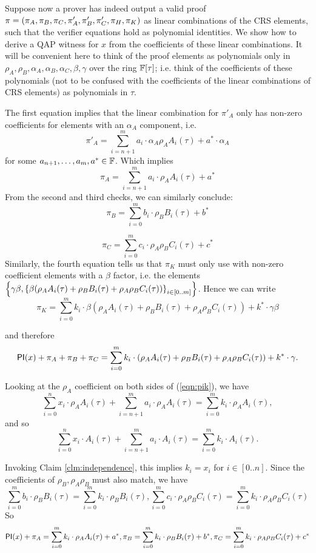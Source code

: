 \documentclass[11pt]{article}
\numberwithin{figure}{section} %
\newcommand{\set}[1]{\ensuremath{\left\{#1\right\}}\xspace}
\begin{document}
Suppose now a prover has indeed output a valid proof $\pi = (\pi_A,\pi_B,\pi_C,\pi'_A,\pi'_B,\pi'_C,\pi_H,\pi_K)$
as linear combinations of the CRS elements, such that the verifier equations hold as polynomial identities.
We show how to derive a QAP witness for $x$ from the coefficients of these linear combinations. 
It will be convenient here to think of the proof elements as polynomials only in $\rho_A,\rho_B,\alpha_A,\alpha_B,\alpha_C,\beta,\gamma$ over the ring $\mathbb F[\tau]$; i.e. think of the coefficients of these polynomials (not to be confused with the coefficients of the linear combinations of CRS elements) as polynomials in $\tau$.
 

The first equation implies that the linear combination for $\pi'_A$ only has non-zero coefficients for elements with an $\alpha_A$ component, i.e.
\[\pi'_A = \sum_{i=n+1}^m a_i\cdot  \alpha_A\rho_A A_i(\tau) + a^*\cdot \alpha_A \]
for some $a_{n+1},\ldots,a_m,a^* \in \mathbb F$.
Which implies 
\[\pi_A = \sum_{i=n+1}^m a_i \cdot \rho_A A_i(\tau) + a^*\]
From the second and third checks, we can similarly conclude:
\[\pi_B = \sum_{i=0}^m b_i\cdot  \rho_B B_i(\tau) + b^*\]

\[\pi_C = \sum_{i=0}^m c_i \cdot \rho_A\rho_B C_i(\tau) + c^*\]
Similarly, the fourth equation tells us that $\pi_K$ must only use with non-zero coefficient elements with a $\beta$ factor,
i.e. the elements $\set{\gamma\beta,\sett{\beta(\rho_A A_i(\tau) + \rho_B B_i(\tau) + \rho_A\rho_B C_i(\tau))}{i\in[0..m]}}$.
Hence we can write
\[\pi_K = \sum_{i=0}^m k_i\cdot\beta(\rho_A A_i(\tau) + \rho_B B_i(\tau) + \rho_A\rho_B C_i(\tau)) + k^*\cdot \gamma\beta\]

and therefore
\begin{equation}\label{eqn:pik}
\mathsf{PI}(x)+\pi_A +\pi_B+\pi_C= \sum_{i=0}^m k_i\cdot(\rho_A A_i(\tau) + \rho_B B_i(\tau) + \rho_A\rho_B C_i(\tau)) + k^*\cdot \gamma.
\end{equation}

Looking at the $\rho_A$ coefficient on both sides of (\ref{eqn:pik}), we have
\[\sum_{i=0}^n x_i \cdot \rho_A A_i(\tau)+\sum_{i=n+1}^m a_i \cdot \rho_A A_i(\tau) = \sum_{i=0}^m k_i\cdot \rho_A A_i(\tau),\]
and so
\[\sum_{i=0}^n x_i \cdot A_i(\tau)+\sum_{i=n+1}^m a_i \cdot A_i(\tau) = \sum_{i=0}^m k_i \cdot A_i(\tau).\]

Invoking Claim \ref{clm:independence}, this implies $k_i=x_i$ for $i\in[0..n]$.
Since the coefficients of $\rho_B,\rho_A\rho_B$ must also match, we have
\[\sum_{i=0}^m b_i\cdot  \rho_B B_i(\tau)= \sum_{i=0}^m k_i \cdot \rho_B B_i(\tau),\sum_{i=0}^m c_i \cdot \rho_A\rho_B C_i(\tau)=\sum_{i=0}^m k_i \cdot\rho_A\rho_B C_i(\tau) \]
So
\[\mathsf{PI}(x)+\pi_A=\sum_{i=0}^m k_i\cdot \rho_A A_i(\tau)+a^*,\pi_B=\sum_{i=0}^m k_i \cdot \rho_B B_i(\tau)+b^*,\pi_C=\sum_{i=0}^m k_i \cdot \rho_A\rho_B C_i(\tau)+c^*\]
\end{document}
